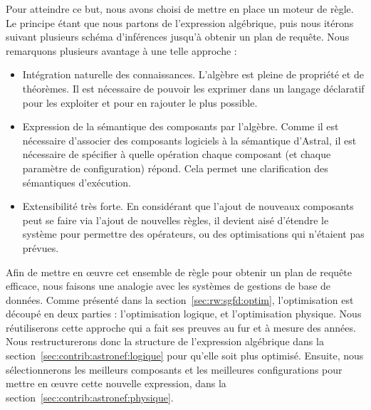 Pour atteindre ce but, nous avons choisi de mettre en place un moteur de règle. Le principe étant que nous partons de l'expression algébrique, puis nous itérons suivant plusieurs schéma d'inférences jusqu'à obtenir un plan de requête. Nous remarquons plusieurs avantage à une telle approche :
\begin{itemize}
	\item Intégration naturelle des connaissances. L'algèbre est pleine de propriété et de théorèmes. Il est nécessaire de pouvoir les exprimer dans un langage déclaratif pour les exploiter et pour en rajouter le plus possible.
	\item Expression de la sémantique des composants par l'algèbre. Comme il est nécessaire d'associer des composants logiciels à la sémantique d'Astral, il est nécessaire de spécifier à quelle opération chaque composant (et chaque paramètre de configuration) répond. Cela permet une clarification des sémantiques d'exécution.
	\item Extensibilité très forte. En considérant que l'ajout de nouveaux composants peut se faire via l'ajout de nouvelles règles, il devient aisé d'étendre le système pour permettre des opérateurs, ou des optimisations qui n'étaient pas prévues.
\end{itemize}

Afin de mettre en œuvre cet ensemble de règle pour obtenir un plan de requête efficace, nous faisons une analogie avec les systèmes de gestions de base de données. Comme présenté dans la section~\ref{sec:rw:sgfd:optim}, l'optimisation est découpé en deux parties : l'optimisation logique, et l'optimisation physique. Nous réutiliserons cette approche qui a fait ses preuves au fur et à mesure des années. Nous restructurerons donc la structure de l'expression algébrique dans la section~\ref{sec:contrib:astronef:logique} pour qu'elle soit plus optimisé. Ensuite, nous sélectionnerons les meilleurs composants et les meilleures configurations pour mettre en œuvre cette nouvelle expression, dans la section~\ref{sec:contrib:astronef:physique}.